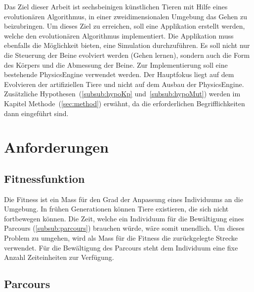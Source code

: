 


    Das Ziel dieser Arbeit ist sechsbeinigen künstlichen Tieren mit Hilfe eines evolutionären Algorithmus,
    in einer zweidimensionalen Umgebung das Gehen zu beizubringen.
    Um dieses Ziel zu erreichen, soll eine Applikation erstellt werden,
    welche den evolutionären Algorithmus implementiert.
    Die Applikation muss ebenfalls die Möglichkeit bieten, eine Simulation durchzuführen.
    Es soll nicht nur die Steuerung der Beine evolviert werden (Gehen lernen),
    sondern auch die Form des Körpers und die Abmessung der Beine.
    Zur Implementierung soll eine bestehende \gls{PhysicsEngine} verwendet werden.
    Der Hauptfokus liegt auf dem Evolvieren der artifiziellen Tiere und nicht auf dem Ausbau der \gls{PhysicsEngine}.
    Zusätzliche Hypothesen~(\vref{subsub:hypoKp} und~\vref{subsub:hypoMut}) werden im Kapitel Methode~(\vref{sec:method}) erwähnt,
    da die erforderlichen Begrifflichkeiten dann eingeführt sind.

  \section{Anforderungen}

    \subsection{Fitnessfunktion}

      Die Fitness ist ein Mass für den Grad der Anpassung eines Individuums an die Umgebung.
      In frühen Generationen können Tiere existieren, die sich nicht fortbewegen können.
      Die Zeit, welche ein Individuum für die Bewältigung eines Parcours (\vref{subsub:parcours}) brauchen würde,
      wäre somit unendlich.
      Um dieses Problem zu umgehen, wird als Mass für die Fitness die zurückgelegte Strecke verwendet.
      Für die Bewältigung des Parcours steht dem Individuum eine fixe Anzahl Zeiteinheiten zur Verfügung.

    \subsection{Parcours\label{subsub:parcours}}

